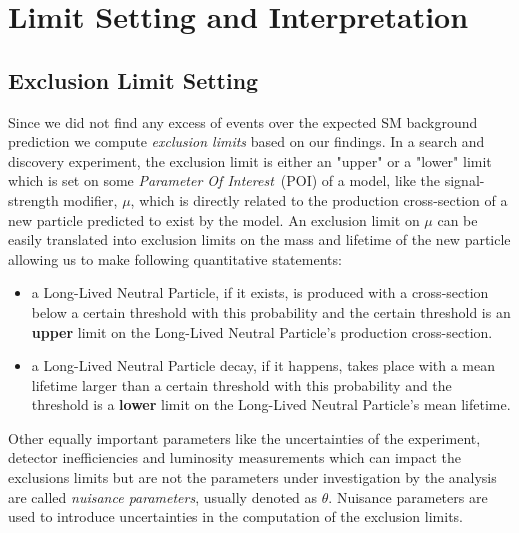 \chapter{Limit  Setting and Interpretation}
\label{Limit_Setting_and_Interpretation_Chapter}

\section{Exclusion Limit Setting}
Since we did not find any excess of events over the expected SM background prediction we compute \textit{exclusion limits} based on our findings. In a search and discovery experiment, the exclusion limit is either an "upper" or a "lower" limit which is set on some \textit{Parameter Of Interest}~(POI) of a model, like the signal-strength modifier, $\mu$, which is directly related to the production cross-section of a new particle predicted to exist by the model. An exclusion limit on $\mu$ can be easily translated into exclusion limits on the mass and lifetime of the new particle allowing us to make following quantitative statements: 
\begin{itemize}
\item a Long-Lived Neutral Particle, if it exists, is produced with a cross-section below a certain threshold with this probability and the certain threshold is an \textbf{upper} limit on the Long-Lived Neutral Particle's production cross-section.
\item a Long-Lived Neutral Particle decay, if it happens, takes place with a mean lifetime larger than a certain threshold with this probability and the threshold is a \textbf{lower} limit on the Long-Lived Neutral Particle's mean lifetime.
\end{itemize}
Other equally important parameters like the uncertainties of the experiment, detector inefficiencies and luminosity  measurements which can impact the exclusions limits but are not the parameters under investigation by the analysis are called \textit{nuisance parameters}, usually denoted as $\mathbb{\theta}$. Nuisance parameters are used to introduce uncertainties in the computation of the exclusion limits.

